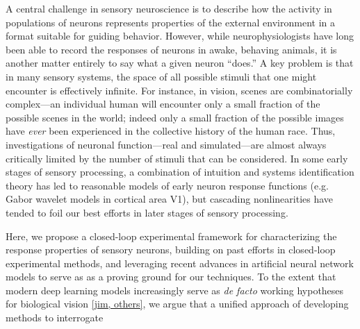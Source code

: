 
A central challenge in sensory neuroscience is to describe how the activity in populations of neurons represents properties of the external environment in a format suitable for guiding behavior.
However, while neurophysiologists have long been able to record the responses of neurons in awake, behaving animals, it is another matter entirely to say what a given neuron ``does.''
A key problem is that in many sensory systems, the space of all possible stimuli that one might encounter is effectively infinite.  For instance, in vision, scenes are combinatorially complex---an individual human will encounter only a small fraction of the possible scenes in the world; indeed only a small fraction of the possible images have \emph{ever} been experienced in the collective history of the human race.
Thus, investigations of neuronal function---real and simulated---are almost always critically limited by the number of stimuli that can be considered. 
In some early stages of sensory processing, a combination of intuition and systems identification theory has led to reasonable models of early neuron response functions (e.g. Gabor wavelet models in cortical area V1), but cascading nonlinearities have tended to foil our best efforts in later stages of sensory processing.

Here, we propose a closed-loop experimental framework for characterizing the response properties of sensory neurons, building on past efforts in closed-loop experimental methods, and leveraging recent advances in artificial neural network models to serve as as a proving ground for our techniques.
To the extent that modern deep learning models increasingly serve as \emph{de facto} working hypotheses for biological vision \ref{jim, others}, we argue that a unified approach of developing methods to interrogate 